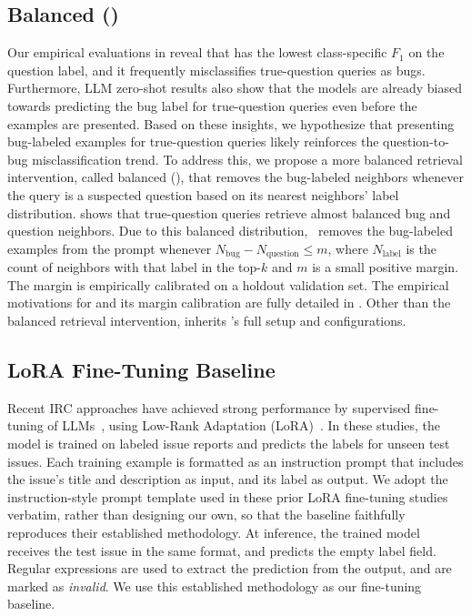 \subsection{Balanced \ragtag (\bragtag)}
\label{sec:approach-bragtag}
Our empirical evaluations in  reveal that \ragtag has the lowest class-specific $F_1$ on the question label, and it frequently misclassifies true-question queries as bugs. Furthermore, LLM zero-shot results also show that the models are already biased towards predicting the bug label for true-question queries even before the examples are presented. Based on these insights, we hypothesize that presenting bug-labeled examples for true-question queries likely reinforces the question-to-bug misclassification trend. To address this, we propose a more balanced retrieval intervention, called balanced \ragtag (\bragtag), that removes the bug-labeled neighbors whenever the query is a suspected question based on its nearest neighbors' label distribution.  shows that true-question queries retrieve almost balanced bug and question neighbors. Due to this balanced distribution, \bragtag\ removes the bug-labeled examples from the prompt whenever $N_\text{bug} - N_\text{question} \le m$, where $N_\text{label}$ is the count of neighbors with that label in the top-$k$ and $m$ is a small positive margin. The margin is empirically calibrated on a holdout validation set. The empirical motivations for \bragtag and its margin calibration are fully detailed in . Other than the balanced retrieval intervention, \bragtag inherits \ragtag's full setup and configurations.



\subsection{LoRA Fine-Tuning Baseline}
\label{sec:finetune}
Recent IRC approaches have achieved strong performance by supervised
fine-tuning of LLMs~\cite{heo2025study,aracena2025applying,
aracena2024applyinglargelanguagemodels}, using Low-Rank Adaptation
(LoRA)~\cite{hu2022lora}. In these studies, the
model is trained on labeled issue reports and predicts the labels for
unseen test issues. Each training example is formatted as an
instruction prompt that includes the issue's title and description
as input, and its label as output. We adopt the instruction-style
prompt template used in these prior LoRA fine-tuning
studies~\cite{heo2025study,aracena2025applying} verbatim, rather than
designing our own, so that the baseline faithfully reproduces their
established methodology. At inference, the trained model
receives the test issue in the same format, and predicts the empty
label field. Regular expressions are used to extract the prediction
from the output, and  are marked as
\textit{invalid}. We use this established methodology as our fine-tuning baseline.

